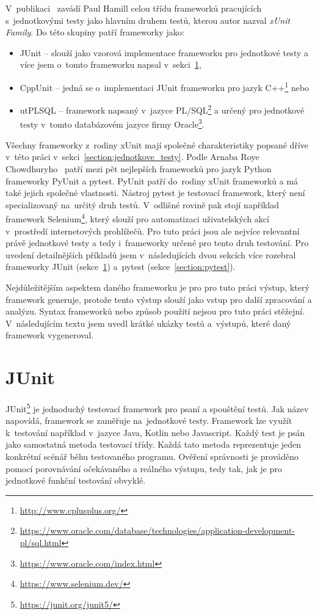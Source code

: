 V~publikaci~\cite{UnitTestFrameworks} zavádí Paul Hamill celou třídu frameworků pracujících s~jednotkovými testy
jako hlavním druhem testů, kterou autor nazval \textit{xUnit Family}. Do této skupiny patří frameworky jako:
\begin{itemize}
    \item JUnit -- slouží jako vzorová implementace frameworku pro jednotkové testy a více jsem o~tomto frameworku napsal v~sekci~\ref{section:junit},
    \item CppUnit -- jedná se o~implementaci JUnit frameworku pro jazyk C++\footnote{\href{http://www.cplusplus.org/}{http://www.cplusplus.org/}} nebo
    \item utPLSQL -- framework napsaný v~jazyce PL/SQL\footnote{\href{https://www.oracle.com/database/technologies/application-development-pl/sql.html}{https://www.oracle.com/database/technologies/application-development-pl/sql.html}} a určený pro jednotkové testy v~tomto databázovém jazyce firmy Oracle\footnote{\href{https://www.oracle.com/index.html}{https://www.oracle.com/index.html}}.
\end{itemize}
Všechny frameworky z~rodiny xUnit mají společné charakteristiky popsané dříve v~této práci
v~sekci~\ref{section:jednotkove_testy}. Podle Arnaba Roye Chowdhuryho~\cite{Top5PythonTestFrameworks} patří mezi pět
nejlepších frameworků pro jazyk Python frameworky PyUnit a pytest. PyUnit patří do~rodiny xUnit frameworků a má také
jejich společné vlastnosti. Nástroj pytest je testovací framework, který není specializovaný na~určitý druh testů.
V~odlišné rovině pak stojí například framework Selenium\footnote{\href{https://www.selenium.dev/}{https://www.selenium.dev/}}, který slouží pro automatizaci
uživatelských akcí v~prostředí internetových prohlížečů. Pro tuto práci jsou ale nejvíce relevantní právě jednotkové testy a tedy i~frameworky určené pro tento druh testování.
Pro uvedení detailnějších příkladů jsem v~následujících dvou sekcích více rozebral frameworky JUnit (sekce~\ref{section:junit}) a~pytest (sekce~\ref{section:pytest}).

Nejdůležitějším aspektem daného frameworku je pro pro tuto práci výstup, který framework generuje, protože tento výstup slouží jako vstup pro další zpracování a analýzu. Syntax frameworků nebo způsob použití nejsou pro tuto práci stěžejní. V~následujícím textu jsem uvedl krátké ukázky testů a~výstupů, které daný framework vygeneroval.

\section{JUnit}
\label{section:junit}
JUnit\footnote{\href{https://junit.org/junit5/}{https://junit.org/junit5/}} je jednoduchý testovací framework pro psaní a spouštění testů. Jak název napovídá, framework se zaměřuje na~jednotkové testy.
Framework lze využít k~testování například v~jazyce Java, Kotlin nebo Javascript.
Každý test je psán jako samostatná metoda testovací třídy. Každá tato metoda reprezentuje jeden konkrétní scénář
běhu testovaného programu. Ověření správnosti je prováděno pomocí porovnávání očekávaného a reálného výstupu, tedy
tak, jak je pro jednotkové funkční testování obvyklé.
\cite{TestDrivenJavaDevelopment}

